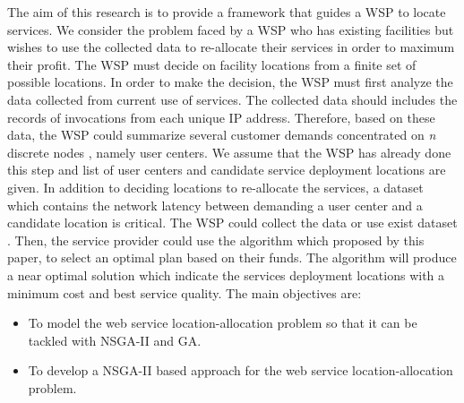 \documentclass{llncs}
\begin{document}
%
%

The aim of this research is to provide a framework that guides a WSP to locate services.
We consider the problem faced by a WSP who has existing facilities but wishes to use the collected data to re-allocate their services in order to maximum their profit.
The WSP must decide on facility locations from a finite set of possible locations. 
In order to make the decision, the WSP must first analyze the data collected from current use of services. 
The collected data should includes the records of invocations from each unique IP address.
Therefore, based on these data, the WSP could summarize several customer demands concentrated on \textit{n} discrete nodes \cite{Aboolian}, namely user centers. 
We assume that the WSP has already done this step and list of user centers and candidate service deployment locations are given.
In addition to deciding locations to re-allocate the services, a dataset which contains the network latency between demanding a user center and a candidate location is critical. 
The WSP could collect the data or use exist dataset  \cite{6076756} \cite{5552800}. 
Then, the service provider could use the algorithm which proposed by this paper, to select an optimal plan based on their funds. 
The algorithm will produce a near optimal solution which indicate the services deployment locations with a minimum cost and best service quality.
The main objectives are:
\begin{itemize}
	\item To model the web service location-allocation problem so that it can be tackled with NSGA-II and GA.
	\item To develop a NSGA-II based approach for the web service location-allocation problem.
\end{itemize}
\end{document}
